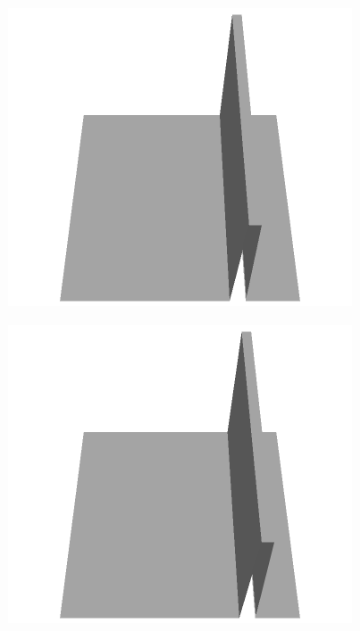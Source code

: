 \documentclass[../document.tex]{subfiles}
\begin{document}
\begin{figure}[H]
    \begin{subfigure}[b]{0.160\textwidth}
    \includegraphics[width=\linewidth]{../img/5/custom_patches/walls_front/all/35-3d.png}
    \end{subfigure}
    \begin{subfigure}[b]{0.160\textwidth}
    \includegraphics[width=\linewidth]{../img/5/custom_patches/walls_front/all/30-3d.png}
    \end{subfigure}
    \begin{subfigure}[b]{0.160\textwidth}

\end{subfigure}
\end{figure}
\end{document}
